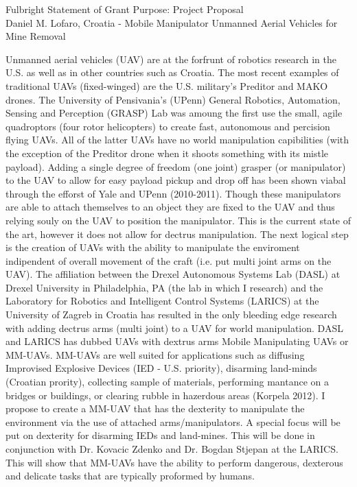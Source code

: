 \documentclass[12pt]{article}
\begin{document}
\begin{center}
Fulbright Statement of Grant Purpose: Project Proposal\\
Daniel M. Lofaro, Croatia - 
Mobile Manipulator Unmanned Aerial Vehicles for Mine Removal\\

\end{center}

Unmanned aerial vehicles (UAV) are at the forfrunt of robotics research in the U.S. as well as in other countries such as Croatia.  The most recent examples of traditional UAVs (fixed-winged) are the U.S. military's Preditor and MAKO drones.  The University of Pensivania's (UPenn) General Robotics, Automation, Sensing and Perception (GRASP) Lab was amoung the first use the small, agile quadroptors (four rotor helicopters) to create fast, autonomous and percision flying UAVs.  All of the latter UAVs have no world manipulation capibilities (with the exception  of the Preditor drone when it shoots something with its mistle payload).  Adding a single degree of freedom (one joint) grasper (or manipulator) to the UAV to allow for easy payload pickup and drop off has been shown viabal through the efforst of Yale and UPenn (2010-2011).  Though these manipulators are able to attach themselves to an object they are fixed to the UAV and thus relying souly on the UAV to position the manipulator.  This is the current state of the art, however it does not allow for dectrus manipulation.  The next logical step is the creation of UAVs with the ability to manipulate the enviroment indipendent of overall movement of the craft (i.e. put multi joint arms on the UAV).   The affiliation between the Drexel Autonomous Systems Lab (DASL) at Drexel University in Philadelphia, PA (the lab in which I research) and the Laboratory for Robotics and Intelligent Control Systems (LARICS) at the University of Zagreb in Croatia has resulted in the only bleeding edge research with adding dectrus arms (multi joint) to a UAV for world manipulation.  DASL and LARICS has dubbed UAVs with dextrus arms Mobile Manipulating UAVs or MM-UAVs.  MM-UAVs are well suited for applications such as diffusing Improvised Explosive Devices (IED - U.S. priority), disarming land-minds (Croatian prority), collecting sample of materials, performing mantance on a bridges or buildings, or clearing rubble in hazerdous areas (Korpela 2012).  I propose to create a MM-UAV that has the dexterity to manipulate the environment via the use of attached  arms/manipulators.  A special focus will be put on dexterity for disarming IEDs and land-mines.  This will be done in conjunction with Dr. Kovacic Zdenko and Dr. Bogdan Stjepan at the LARICS.  This will show that MM-UAVs have the ability to perform dangerous, dexterous and delicate tasks that are typically proformed by humans.
\end{document}
